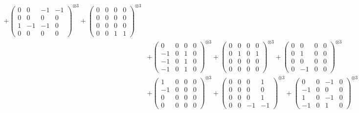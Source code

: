 \documentclass{article}
\begin{document}
{\begin{align}
            + \begin{pmatrix} 0 & 0 & -1 & -1 \\ 0 & 0 & 0 & 0 \\ 1 & -1 & -1 & 0 \\ 0 & 0 & 0 & 0 \end{pmatrix}^{\otimes 3} 
            + \begin{pmatrix} 0 & 0 & 0 & 0 \\ 0 & 0 & 0 & 0 \\ 0 & 0 & 0 & 0 \\ 0 & 0 & 1 & 1 \end{pmatrix}^{\otimes 3} \\
        &+ \label{Rs16-Rc11-Solution-30-c10} \begin{pmatrix} 0 & 0 & 0 & 0 \\ -1 & 0 & 1 & 0 \\ -1 & 0 & 1 & 0 \\ -1 & 0 & 1 & 0 \end{pmatrix}^{\otimes 3} 
            + \begin{pmatrix} 0 & 0 & 0 & 0 \\ 0 & 1 & 0 & 1 \\ 0 & 0 & 0 & 0 \\ 0 & 0 & 0 & 0 \end{pmatrix}^{\otimes 3} 
            + \begin{pmatrix} 0 & 0 & 0 & 0 \\ 0 & 1 & 0 & 0 \\ 0 & 0 & 0 & 0 \\ 0 & -1 & 0 & 0 \end{pmatrix}^{\otimes 3} \\
        &+ \label{Rs16-Rc11-Solution-30-c13} \begin{pmatrix} 1 & 0 & 0 & 0 \\ -1 & 0 & 0 & 0 \\ 0 & 0 & 0 & 0 \\ 0 & 0 & 0 & 0 \end{pmatrix}^{\otimes 3} 
            + \begin{pmatrix} 0 & 0 & 0 & 1 \\ 0 & 0 & 0 & 0 \\ 0 & 0 & 0 & 1 \\ 0 & 0 & -1 & -1 \end{pmatrix}^{\otimes 3} 
            + \begin{pmatrix} 0 & 0 & -1 & 0 \\ -1 & 0 & 0 & 0 \\ 1 & 0 & -1 & 0 \\ -1 & 0 & 1 & 0 \end{pmatrix}^{\otimes 3} \\

\end{align}}
\end{document}
